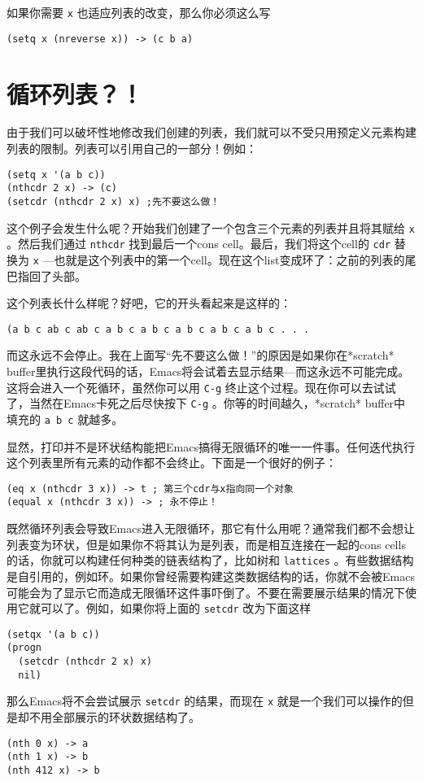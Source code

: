 如果你需要 \texttt{x} 也适应列表的改变，那么你必须这么写

\begin{verbatim}
(setq x (nreverse x)) -> (c b a)
\end{verbatim}

\section{循环列表？！}
\label{section:06-Circular-Lists}

由于我们可以破坏性地修改我们创建的列表，我们就可以不受只用预定义元素构建列表的限制。列表可以引用自己的一部分！例如：

\begin{verbatim}
(setq x '(a b c))
(nthcdr 2 x) -> (c)
(setcdr (nthcdr 2 x) x) ;先不要这么做！
\end{verbatim}

这个例子会发生什么呢？开始我们创建了一个包含三个元素的列表并且将其赋给 \texttt{x} 。然后我们通过 \texttt{nthcdr} 找到最后一个cons cell。最后，我们将这个cell的 \texttt{cdr} 替换为 \texttt{x} ---也就是这个列表中的第一个cell。现在这个list变成环了：之前的列表的尾巴指回了头部。

这个列表长什么样呢？好吧，它的开头看起来是这样的：

\begin{verbatim}
(a b c ab c ab c a b c a b c a b c a b c a b c . . .
\end{verbatim}

而这永远不会停止。我在上面写“先不要这么做！”的原因是如果你在*scratch* buffer里执行这段代码的话，Emacs将会试着去显示结果---而这永远不可能完成。这将会进入一个死循环，虽然你可以用 \verb|C-g| 终止这个过程。现在你可以去试试了，当然在Emacs卡死之后尽快按下 \verb|C-g| 。你等的时间越久，*scratch* buffer中填充的 \verb|a b c| 就越多。

显然，打印并不是环状结构能把Emacs搞得无限循环的唯一一件事。任何迭代执行这个列表里所有元素的动作都不会终止。下面是一个很好的例子：

\begin{verbatim}
(eq x (nthcdr 3 x)) -> t ; 第三个cdr与x指向同一个对象
(equal x (nthcdr 3 x)) -> ; 永不停止！
\end{verbatim}

既然循环列表会导致Emacs进入无限循环，那它有什么用呢？通常我们都不会想让列表变为环状，但是如果你不将其认为是列表，而是相互连接在一起的cons cells的话，你就可以构建任何种类的链表结构了，比如树和 \texttt{lattices} 。有些数据结构是自引用的，例如环。如果你曾经需要构建这类数据结构的话，你就不会被Emacs可能会为了显示它而造成无限循环这件事吓倒了。不要在需要展示结果的情况下使用它就可以了。例如，如果你将上面的 \texttt{setcdr} 改为下面这样

\begin{verbatim}
(setqx '(a b c))
(progn
  (setcdr (nthcdr 2 x) x)
  nil)
\end{verbatim}

那么Emacs将不会尝试展示 \texttt{setcdr} 的结果，而现在 \texttt{x} 就是一个我们可以操作的但是却不用全部展示的环状数据结构了。

\begin{verbatim}
(nth 0 x) -> a
(nth 1 x) -> b
(nth 412 x) -> b
\end{verbatim}

